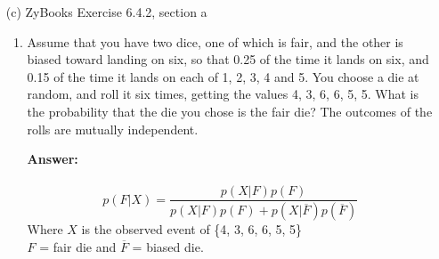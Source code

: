 \documentclass[14pt]{extreport}
\newcommand{\answer}[0]{\medskip \textbf{Answer:} \medskip}
\begin{document}
\begin{enumerate}[label=(\alph*)]
        \begin{enumerate}
            \item[(b)] The first 5 flips comes up heads. The last 5 flips come up tails.  
            
                \answer\\
                Probability of first 5 flips being heads = $(\frac{1}{3})^{5}$\\
                Probability of last 5 flips being tails = $(\frac{2}{3})^{5}$\\
                $\therefore p = (\frac{1}{3})^{5} \times (\frac{2}{3})^{5}$\\
                
            \item[(c)] The first flip comes up heads. The rest of the flips come up tails.
            
                \answer\\
                Probability of first flip being heads = $(\frac{1}{3})^{1}$\\
                Probability of last 9 flips being tails = $(\frac{2}{3})^{9}$\\
                $\therefore p = (\frac{1}{3})^{1} \times (\frac{2}{3})^{9}$\\
                
        \end{enumerate}
    
    \item[(c)] ZyBooks Exercise 6.4.2, section a
    
        \begin{enumerate}
            \item Assume that you have two dice, one of which is fair, and the other is biased toward landing on six, so that 0.25 of the time it lands on six, and 0.15 of the time it lands on each of 1, 2, 3, 4 and 5. You choose a die at random, and roll it six times, getting the values 4, 3, 6, 6, 5, 5. What is the probability that the die you chose is the fair die? The outcomes of the rolls are mutually independent.
            
                \answer\\
                    \\
                    \begin{equation*}
                    p(F|X)=\frac{p(X|F)p(F)}{p(X|F)p(F)+p(X|\overline{F})p(\overline{F})}
                    \end{equation*}
                    Where $X$ is the observed event of \{4, 3, 6, 6, 5, 5\}\\
                    $F$ = fair die and $\overline{F}$ = biased die.\\
            

\end{enumerate}
\end{enumerate}
\end{document}
